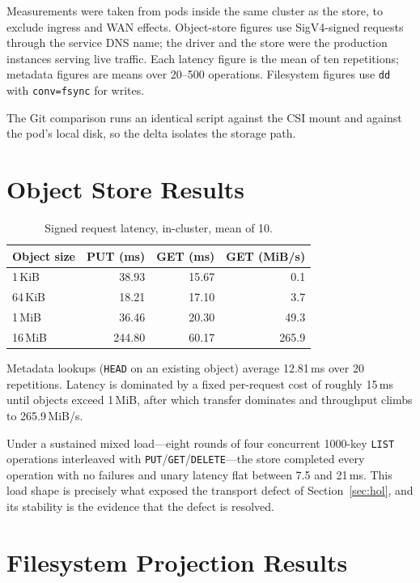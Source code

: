 \documentclass[11pt]{article}
\begin{document}
Measurements were taken from pods inside the same cluster as the store, to
exclude ingress and WAN effects. Object-store figures use SigV4-signed
requests through the service DNS name; the driver and the store were the
production instances serving live traffic. Each latency figure is the mean of
ten repetitions; metadata figures are means over 20--500 operations.
Filesystem figures use \texttt{dd} with \texttt{conv=fsync} for writes.

The Git comparison runs an identical script against the CSI mount and against
the pod's local disk, so the delta isolates the storage path.

\section{Object Store Results}

\begin{table}[h]
\centering
\begin{tabular}{lrrr}
\toprule
Object size & PUT (ms) & GET (ms) & GET (MiB/s) \\
\midrule
1\,KiB   &  38.93 & 15.67 &   0.1 \\
64\,KiB  &  18.21 & 17.10 &   3.7 \\
1\,MiB   &  36.46 & 20.30 &  49.3 \\
16\,MiB  & 244.80 & 60.17 & 265.9 \\
\bottomrule
\end{tabular}
\caption{Signed request latency, in-cluster, mean of 10.}
\end{table}

Metadata lookups (\texttt{HEAD} on an existing object) average
12.81\,ms over 20 repetitions. Latency is dominated by a fixed
per-request cost of roughly 15\,ms until objects exceed 1\,MiB,
after which transfer dominates and throughput climbs to 265.9\,MiB/s.

Under a sustained mixed load---eight rounds of four concurrent
1000-key \texttt{LIST} operations interleaved with
\texttt{PUT}/\texttt{GET}/\texttt{DELETE}---the store completed every
operation with no failures and unary latency flat between 7.5 and
21\,ms. This load shape is precisely what exposed the transport defect
of Section~\ref{sec:hol}, and its stability is the evidence that the defect
is resolved.

\section{Filesystem Projection Results}
\end{document}
